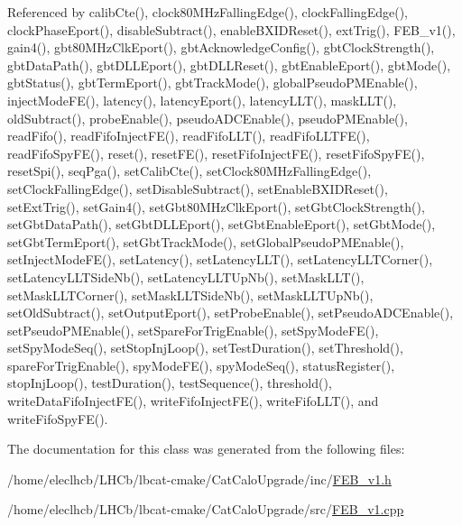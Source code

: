 Referenced by calib\+Cte(), clock80\+M\+Hz\+Falling\+Edge(), clock\+Falling\+Edge(), clock\+Phase\+Eport(), disable\+Subtract(), enable\+B\+X\+I\+D\+Reset(), ext\+Trig(), F\+E\+B\+\_\+v1(), gain4(), gbt80\+M\+Hz\+Clk\+Eport(), gbt\+Acknowledge\+Config(), gbt\+Clock\+Strength(), gbt\+Data\+Path(), gbt\+D\+L\+L\+Eport(), gbt\+D\+L\+L\+Reset(), gbt\+Enable\+Eport(), gbt\+Mode(), gbt\+Status(), gbt\+Term\+Eport(), gbt\+Track\+Mode(), global\+Pseudo\+P\+M\+Enable(), inject\+Mode\+F\+E(), latency(), latency\+Eport(), latency\+L\+L\+T(), mask\+L\+L\+T(), old\+Subtract(), probe\+Enable(), pseudo\+A\+D\+C\+Enable(), pseudo\+P\+M\+Enable(), read\+Fifo(), read\+Fifo\+Inject\+F\+E(), read\+Fifo\+L\+L\+T(), read\+Fifo\+L\+L\+T\+F\+E(), read\+Fifo\+Spy\+F\+E(), reset(), reset\+F\+E(), reset\+Fifo\+Inject\+F\+E(), reset\+Fifo\+Spy\+F\+E(), reset\+Spi(), seq\+Pga(), set\+Calib\+Cte(), set\+Clock80\+M\+Hz\+Falling\+Edge(), set\+Clock\+Falling\+Edge(), set\+Disable\+Subtract(), set\+Enable\+B\+X\+I\+D\+Reset(), set\+Ext\+Trig(), set\+Gain4(), set\+Gbt80\+M\+Hz\+Clk\+Eport(), set\+Gbt\+Clock\+Strength(), set\+Gbt\+Data\+Path(), set\+Gbt\+D\+L\+L\+Eport(), set\+Gbt\+Enable\+Eport(), set\+Gbt\+Mode(), set\+Gbt\+Term\+Eport(), set\+Gbt\+Track\+Mode(), set\+Global\+Pseudo\+P\+M\+Enable(), set\+Inject\+Mode\+F\+E(), set\+Latency(), set\+Latency\+L\+L\+T(), set\+Latency\+L\+L\+T\+Corner(), set\+Latency\+L\+L\+T\+Side\+Nb(), set\+Latency\+L\+L\+T\+Up\+Nb(), set\+Mask\+L\+L\+T(), set\+Mask\+L\+L\+T\+Corner(), set\+Mask\+L\+L\+T\+Side\+Nb(), set\+Mask\+L\+L\+T\+Up\+Nb(), set\+Old\+Subtract(), set\+Output\+Eport(), set\+Probe\+Enable(), set\+Pseudo\+A\+D\+C\+Enable(), set\+Pseudo\+P\+M\+Enable(), set\+Spare\+For\+Trig\+Enable(), set\+Spy\+Mode\+F\+E(), set\+Spy\+Mode\+Seq(), set\+Stop\+Inj\+Loop(), set\+Test\+Duration(), set\+Threshold(), spare\+For\+Trig\+Enable(), spy\+Mode\+F\+E(), spy\+Mode\+Seq(), status\+Register(), stop\+Inj\+Loop(), test\+Duration(), test\+Sequence(), threshold(), write\+Data\+Fifo\+Inject\+F\+E(), write\+Fifo\+Inject\+F\+E(), write\+Fifo\+L\+L\+T(), and write\+Fifo\+Spy\+F\+E().



The documentation for this class was generated from the following files\+:\begin{DoxyCompactItemize}
\item 
/home/eleclhcb/\+L\+H\+Cb/lbcat-\/cmake/\+Cat\+Calo\+Upgrade/inc/\hyperlink{FEB__v1_8h}{F\+E\+B\+\_\+v1.\+h}\item 
/home/eleclhcb/\+L\+H\+Cb/lbcat-\/cmake/\+Cat\+Calo\+Upgrade/src/\hyperlink{FEB__v1_8cpp}{F\+E\+B\+\_\+v1.\+cpp}\end{DoxyCompactItemize}
